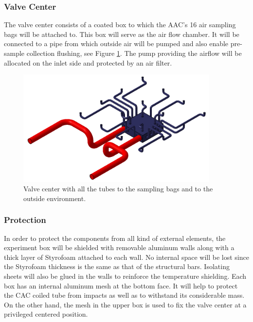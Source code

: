 \pagebreak
\subsubsection{Valve Center}

The valve center consists of a coated box to which the AAC's 16 air sampling bags will be attached to. This box will serve as the air flow chamber. It will be connected to a pipe from which outside air will be pumped and also enable pre-sample collection flushing, see Figure \ref{valve_center_and_pipes}. The pump providing the airflow will be allocated on the inlet side and protected by an air filter. 


\begin{figure}[!ht]
    \centering
    \includegraphics[width=0.9\textwidth]{4-experiment-design/img/valve_collector.jpg}
    \caption{Valve center with all the tubes to the sampling bags and to the outside environment.}
    \label{valve_center_and_pipes}
\end{figure}

\pagebreak
\subsubsection{Protection}

In order to protect the components from all kind of external elements, the experiment box will be shielded with removable aluminum walls along with a thick layer of Styrofoam attached to each wall. No internal space will be lost since the Styrofoam thickness is the same as that of the structural bars. Isolating sheets will also be glued in the walls to reinforce the temperature shielding. Each box has an internal aluminum mesh at the bottom face. It will help to protect the CAC coiled tube from impacts as well as to withstand its considerable mass. On the other hand, the mesh in the upper box is used to fix the valve center at a privileged centered position.

